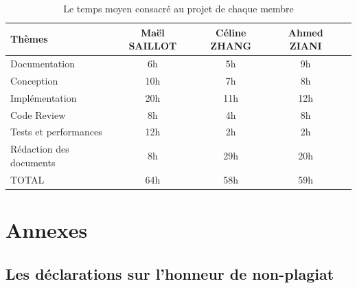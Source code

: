 \documentclass[12pt]{article}
\begin{document}
    \newpage
        \begin{table}[!h]
            \begin{center}
                \begin{tabular}{|l|c|c|c|c|}
                    \hline
                    Thèmes & Maël SAILLOT & Céline ZHANG & Ahmed ZIANI \\
                    \hline
                    Documentation & 6h & 5h & 9h \\
                    Conception & 10h & 7h & 8h \\
                    Implémentation & 20h & 11h & 12h \\
                    Code Review & 8h & 4h & 8h \\
                    Tests et performances & 12h & 2h & 2h \\
                    Rédaction des documents & 8h & 29h & 20h \\
                    \hline
                    TOTAL & 64h & 58h & 59h \\
                    \hline
                \end{tabular}
            \end{center}
            \caption{Le temps moyen consacré au projet de chaque membre}
            \label{tab:times}
        \end{table}

\newpage

\section*{Annexes}
    
    \subsection*{Les déclarations sur l'honneur de non-plagiat}
    
    \newpage
    
    \newpage
    
    \newpage
    
\end{document}
